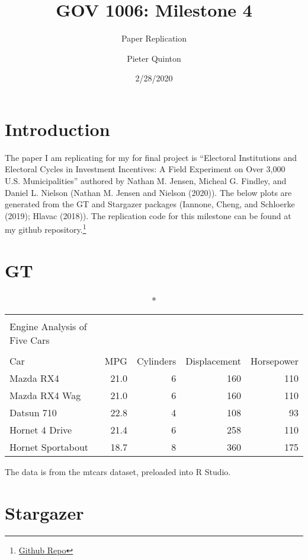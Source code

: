 \documentclass[]{article}
\title{GOV 1006: Milestone 4}
\subtitle{Paper Replication}
\author{Pieter Quinton}
\date{2/28/2020}
\let\rmarkdownfootnote\footnote%
\def\footnote{\protect\rmarkdownfootnote}
\begin{document}
\maketitle

{
\setcounter{tocdepth}{2}
\tableofcontents
}
\hypertarget{introduction}{%
\section{Introduction}\label{introduction}}

The paper I am replicating for my for final project is ``Electoral Institutions and Electoral Cycles in Investment Incentives: A Field Experiment on Over 3,000 U.S. Municipalities'' authored by Nathan M. Jensen, Micheal G. Findley, and Daniel L. Nielson (Nathan M. Jensen and Nielson (2020)). The below plots are generated from the GT and Stargazer packages (Iannone, Cheng, and Schloerke (2019); Hlavac (2018)). The replication code for this milestone can be found at my github repository.\footnote{\href{https://github.com/PGQuinton/gov1006-milestone4}{Github Repo}}

\hypertarget{gt}{%
\section{GT}\label{gt}}

\captionsetup[table]{labelformat=empty,skip=1pt}
\begin{longtable}{lrrrr}
\caption*{
\large Car Data\\ 
\small Engine Analysis of Five Cars\\ 
} \\ 
\toprule
Car & MPG & Cylinders & Displacement & Horsepower \\ 
\midrule
Mazda RX4 & 21.0 & 6 & 160 & 110 \\ 
Mazda RX4 Wag & 21.0 & 6 & 160 & 110 \\ 
Datsun 710 & 22.8 & 4 & 108 & 93 \\ 
Hornet 4 Drive & 21.4 & 6 & 258 & 110 \\ 
Hornet Sportabout & 18.7 & 8 & 360 & 175 \\ 
\bottomrule
\end{longtable}
\begin{minipage}{\linewidth}
The data is from the mtcars dataset, preloaded into R Studio.\\ 
\end{minipage}

\newpage

\hypertarget{stargazer}{%
\section{Stargazer}\label{stargazer}}
\end{document}
